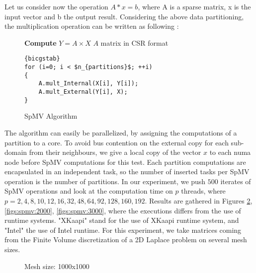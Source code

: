 \documentclass{Styles/llncs}
\begin{document}
Let us consider now the operation $A * x = b$, where A is a sparse matrix, x is the input vector and b the output result. Considering the above data partitioning, the multiplication operation can be written as following :

\begin{figure}[tc]
\begin{center}
\begin{minipage}[c]{0.6\linewidth}
\small{
\textbf{Compute} $Y =  A\times X$
$A$ matrix in CSR format\\
}
\begin{lstlisting}[frame=none,style=smaller,showlines=true,mathescape=true,firstnumber=1]{bicgstab}
for (i=0; i < $n_{partitions}$; ++i)
{
	A.mult_Internal(X[i], Y[i]); 
	A.mult_External(Y[i], X);
}
\end{lstlisting}
\end{minipage}\hfill
\end{center}
\caption{SpMV Algorithm} \label{lst:spmv}
\end{figure}

The algorithm can easily be parallelized, by assigning the computations of a partition to a core. To avoid bus contention on the external copy for each sub-domain from their neighbours, we give a local copy of the vector $x$ to each numa node before SpMV computations for this test. Each partition computations are encapsulated in an independent task, so the number of inserted tasks per SpMV operation is the number of partitions. In our experiment, we push $500$ iterates of SpMV operations and look at the computation time on $p$ threads, where $p= {2,4,8,10,12,16,32,48,64,92,128,160,192}$. Results are gathered in Figures \ref{figs:spmv:1000}, \ref{figs:spmv:2000}, \ref{figs:spmv:3000}, where the executions differs from the use of runtime systems. "XKaapi" stand for the use of XKaapi runtime system, and "Intel" the use of Intel runtime. For this experiment, we take matrices coming from the Finite Volume discretization of a 2D Laplace problem on several mesh sizes.  

\begin{figure}
  \centering
    \caption{Mesh size: 1000x1000}
    \label{figs:spmv:1000}
\end{figure}
\end{document}
